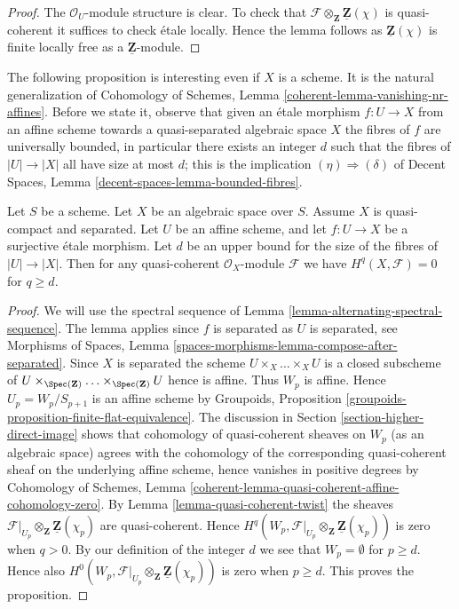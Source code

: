 \begin{proof}
The $\mathcal{O}_U$-module structure is clear. To check that
$\mathcal{F} \otimes_{\mathbf{Z}} \underline{\mathbf{Z}}(\chi)$
is quasi-coherent it suffices to check \'etale locally.
Hence the lemma follows as $\underline{\mathbf{Z}}(\chi)$
is finite locally free as a $\underline{\mathbf{Z}}$-module.
\end{proof}

\noindent
The following proposition is interesting even if $X$ is a scheme.
It is the natural generalization of
Cohomology of Schemes, Lemma \ref{coherent-lemma-vanishing-nr-affines}.
Before we state it, observe that given an \'etale morphism
$f : U \to X$ from an affine scheme towards a quasi-separated algebraic
space $X$ the fibres of $f$ are universally bounded, in particular
there exists an integer $d$ such that the fibres of $|U| \to |X|$
all have size at most $d$; this is the implication
$(\eta) \Rightarrow (\delta)$ of
Decent Spaces, Lemma \ref{decent-spaces-lemma-bounded-fibres}.

\begin{proposition}
\label{proposition-vanishing}
Let $S$ be a scheme. Let $X$ be an algebraic space over $S$.
Assume $X$ is quasi-compact and separated.
Let $U$ be an affine scheme, and let
$f : U \to X$ be a surjective \'etale morphism.
Let $d$ be an upper bound for the size of the fibres of
$|U| \to |X|$. Then for any quasi-coherent $\mathcal{O}_X$-module $\mathcal{F}$
we have $H^q(X, \mathcal{F}) = 0$ for $q \geq d$.
\end{proposition}

\begin{proof}
We will use the spectral sequence of
Lemma \ref{lemma-alternating-spectral-sequence}.
The lemma applies since $f$ is separated as $U$ is separated, see
Morphisms of Spaces, Lemma
\ref{spaces-morphisms-lemma-compose-after-separated}.
Since $X$ is separated the scheme $U \times_X \ldots \times_X U$ is a closed
subscheme of
$U \times_{\Spec(\mathbf{Z})} \ldots \times_{\Spec(\mathbf{Z})} U$
hence is affine. Thus $W_p$ is affine. Hence $U_p = W_p/S_{p + 1}$ is an
affine scheme by
Groupoids, Proposition \ref{groupoids-proposition-finite-flat-equivalence}.
The discussion in
Section \ref{section-higher-direct-image}
shows that cohomology of quasi-coherent sheaves on $W_p$ (as an algebraic
space) agrees with the cohomology of the corresponding quasi-coherent
sheaf on the underlying affine scheme, hence vanishes in positive degrees by
Cohomology of Schemes, Lemma
\ref{coherent-lemma-quasi-coherent-affine-cohomology-zero}.
By
Lemma \ref{lemma-quasi-coherent-twist}
the sheaves
$\mathcal{F}|_{U_p} \otimes_\mathbf{Z} \underline{\mathbf{Z}}(\chi_p)$
are quasi-coherent. Hence
$H^q(W_p,
\mathcal{F}|_{U_p} \otimes_\mathbf{Z} \underline{\mathbf{Z}}(\chi_p))$
is zero when $q > 0$. By our definition of the integer $d$ we see that
$W_p = \emptyset$ for $p \geq d$. Hence also
$H^0(W_p,
\mathcal{F}|_{U_p} \otimes_\mathbf{Z} \underline{\mathbf{Z}}(\chi_p))$
is zero when $p \geq d$.
This proves the proposition.
\end{proof}

